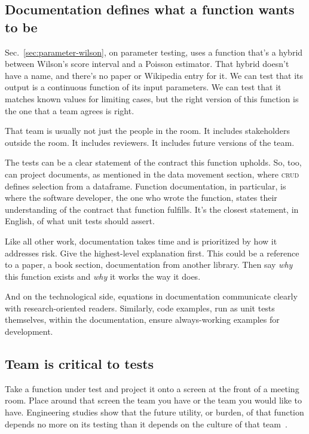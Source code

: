 \documentclass[fleqn,10pt]{olplainarticle}
\begin{document}
\subsection{Documentation defines what a function wants to be}

Sec.~\ref{sec:parameter-wilson}, on parameter testing, uses a function that's a hybrid
between Wilson's score interval and a Poisson estimator. That hybrid
doesn't have a name, and there's no paper or Wikipedia entry for it.
We can test that its output is a continuous function of its input
parameters. We can test that it matches known values for limiting cases,
but the right version of this function is the one that a team agrees
is right.

That team is usually not just the people in the room. It includes stakeholders
outside the room. It includes reviewers. It includes future versions of the team.

The tests can be a clear statement of the contract this function upholds.
So, too, can project documents, as mentioned in the data movement section,
where \textsc{crud} defines selection from a dataframe. 
Function documentation, in particular, is where the software
developer, the one who wrote the function, states their understanding
of the contract that function fulfills. It's the closest statement,
in English, of what unit tests should assert.

Like all other work, documentation takes time and is prioritized by
how it addresses risk. Give the highest-level explanation first.
This could be a reference to a paper, a book section, documentation from another library.
Then say \emph{why} this function exists and \emph{why} it works the
way it does.

And on the technological side, equations in documentation communicate
clearly with research-oriented readers. Similarly, code examples, run
as unit tests themselves, within the documentation, ensure always-working
examples for development.


\subsection{Team is critical to tests}

Take a function under test and project it onto a
screen at the front of a meeting room. Place around that screen
the team you have or the team you would like to have.
Engineering studies show that the future utility, or burden,
of that function depends no more on its testing than it
depends on the culture of that team~\citep{neumann2016,kanewala2014}.
\end{document}

